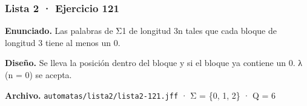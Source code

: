 
\hypertarget{lista-2-ejercicio-121}{%
\subsubsection{Lista 2 · Ejercicio 121}\label{lista-2-ejercicio-121}}

\textbf{Enunciado.} Las palabras de Σ1 de longitud 3n tales que cada bloque de longitud 3 tiene al menos un 0.

\textbf{Diseño.} Se lleva la posición dentro del bloque y si el bloque ya contiene un 0. λ (n = 0) se acepta.

\textbf{Archivo.} \texttt{automatas/lista2/lista2-121.jff} · Σ = \{0, 1, 2\} · \textbar Q\textbar{} = 6


